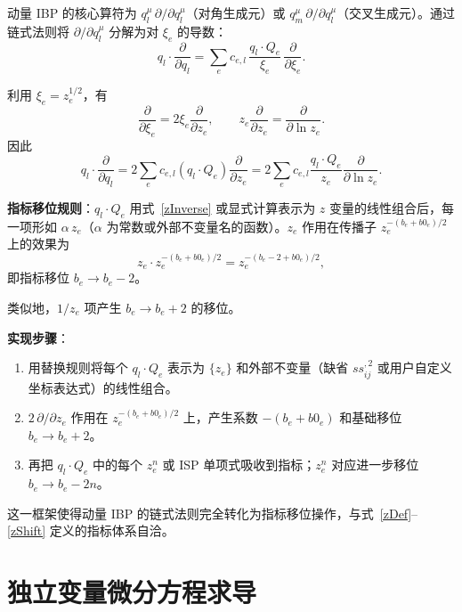 ﻿\documentclass[a4paper,11pt]{article}
\begin{document}
动量 IBP 的核心算符为 $q_l^\mu\, \partial / \partial q_l^\mu$（对角生成元）或 $q_m^\mu\, \partial / \partial q_l^\mu$（交叉生成元）。通过链式法则将 $\partial / \partial q_l^\mu$ 分解为对 $\xi_e$ 的导数：
\begin{equation}
  q_l \cdot \frac{\partial}{\partial q_l} = \sum_e c_{e,l}\, \frac{q_l \cdot Q_e}{\xi_e}\, \frac{\partial}{\partial \xi_e}.
  \label{chainRuleXi}
\end{equation}

利用 $\xi_e=z_e^{1/2}$，有
\begin{equation}
 \frac{\partial}{\partial\xi_e}
 =2\xi_e\frac{\partial}{\partial z_e},
 \qquad
 z_e\frac{\partial}{\partial z_e}
 =\frac{\partial}{\partial\ln z_e}.
\end{equation}
因此
\begin{equation}
  q_l \cdot \frac{\partial}{\partial q_l}
  =2\sum_e c_{e,l}(q_l\cdot Q_e)\frac{\partial}{\partial z_e}
  =2\sum_e c_{e,l}\frac{q_l\cdot Q_e}{z_e}
     \frac{\partial}{\partial\ln z_e}.
  \label{chainRuleZ}
\end{equation}

\textbf{指标移位规则}：$q_l \cdot Q_e$ 用式~\eqref{zInverse} 或显式计算表示为 $z$ 变量的线性组合后，每一项形如 $\alpha\, z_e$（$\alpha$ 为常数或外部不变量名的函数）。$z_e$ 作用在传播子 $z_e^{-(b_e+b0_e)/2}$ 上的效果为
\begin{equation}
  z_e \cdot z_e^{-(b_e+b0_e)/2} = z_e^{-(b_e - 2 + b0_e)/2},
  \label{zShift}
\end{equation}
即指标移位 $b_e \to b_e - 2$。

类似地，$1/z_e$ 项产生 $b_e \to b_e + 2$ 的移位。

\textbf{实现步骤}：
\begin{enumerate}
  \item 用替换规则将每个 $q_l \cdot Q_e$ 表示为 $\{z_e\}$ 和外部不变量（缺省 $ss_{ij}^{,2}$ 或用户自定义坐标表达式）的线性组合。
  \item $2\,\partial/\partial z_e$ 作用在 $z_e^{-(b_e+b0_e)/2}$ 上，产生系数 $-(b_e+b0_e)$ 和基础移位 $b_e\to b_e+2$。
  \item 再把 $q_l\cdot Q_e$ 中的每个 $z_e^n$ 或 ISP 单项式吸收到指标；$z_e^n$ 对应进一步移位 $b_e\to b_e-2n$。
\end{enumerate}

这一框架使得动量 IBP 的链式法则完全转化为指标移位操作，与式~\eqref{zDef}--\eqref{zShift} 定义的指标体系自洽。

\section{独立变量微分方程求导}
\end{document}
